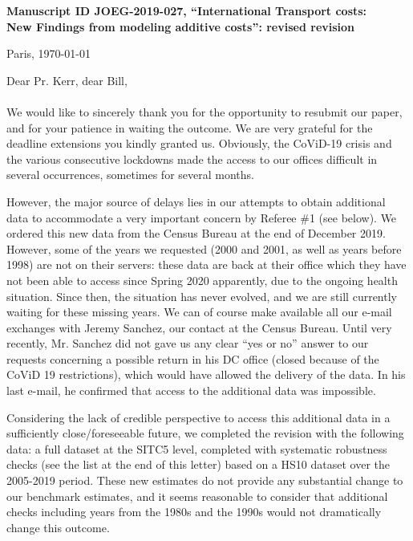 \documentclass[12pt]{article}
\begin{document}
\noindent \textbf{Manuscript ID JOEG-2019-027, ``International Transport costs:\\New Findings from modeling additive costs'': revised revision}

\bigskip
\bigskip

\hfill Paris, \today

\bigskip
\noindent Dear Pr. Kerr, dear Bill, \\
\\
\noindent \noindent We would like to sincerely thank you for the opportunity to resubmit our paper, and for your patience in waiting the outcome. We are very grateful for the deadline extensions you kindly granted us. Obviously, the CoViD-19 crisis and the various consecutive lockdowns made the access to our offices difficult in several occurrences, sometimes for several months. \medskip

However, the major source of delays lies in our attempts to obtain additional data to accommodate a very important concern by Referee \#1 (see below). We ordered this new data from the Census Bureau at the end of December 2019. However, some of the years we requested (2000 and 2001, as well as years before 1998) are not on their servers: these data are back at their office which they have not been able to access since Spring 2020 apparently, due to the ongoing health situation. Since then, the situation has never evolved, and we are still currently waiting for these missing years. We can of course make available all our e-mail exchanges with Jeremy Sanchez, our contact at the Census Bureau. Until very recently, Mr. Sanchez did not gave us any clear ``yes or no'' answer to our requests concerning a possible return in his DC office (closed because of the CoViD 19 restrictions), which would have allowed the delivery of the data. In his last e-mail, he confirmed that access to the additional data was impossible.\medskip

Considering the lack of credible perspective to access this additional data in a sufficiently close/foreseeable future, we completed the revision with the following data: a full dataset at the SITC5 level, completed with systematic robustness checks (see the list at the end of this letter) based on a HS10 dataset over the 2005-2019 period.
These new estimates do not provide any substantial change to our benchmark estimates, and it seems reasonable to consider that additional checks including years from the 1980s and the 1990s would not dramatically change this outcome. \medskip
\end{document}
